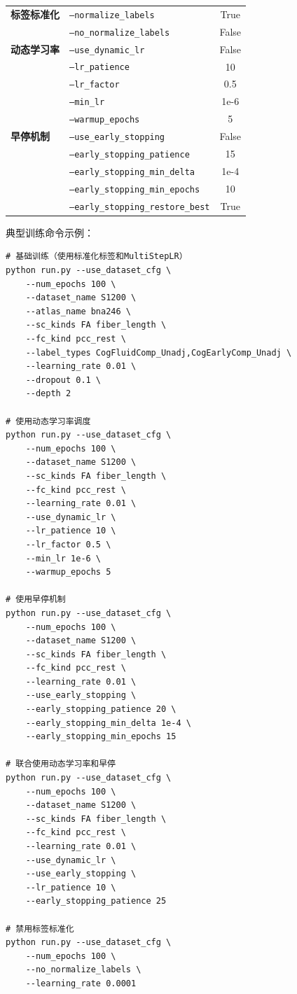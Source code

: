 \begin{table}[htbp]
\begin{tabular}{llc}
\textbf{标签标准化} & \texttt{--normalize\_labels} & True \\
 & \texttt{--no\_normalize\_labels} & False \\
\midrule
\textbf{动态学习率} & \texttt{--use\_dynamic\_lr} & False \\
 & \texttt{--lr\_patience} & 10 \\
 & \texttt{--lr\_factor} & 0.5 \\
 & \texttt{--min\_lr} & 1e-6 \\
 & \texttt{--warmup\_epochs} & 5 \\
\midrule
\textbf{早停机制} & \texttt{--use\_early\_stopping} & False \\
 & \texttt{--early\_stopping\_patience} & 15 \\
 & \texttt{--early\_stopping\_min\_delta} & 1e-4 \\
 & \texttt{--early\_stopping\_min\_epochs} & 10 \\
 & \texttt{--early\_stopping\_restore\_best} & True \\
\bottomrule
\end{tabular}
\end{table}

典型训练命令示例：

\begin{verbatim}
# 基础训练（使用标准化标签和MultiStepLR）
python run.py --use_dataset_cfg \
    --num_epochs 100 \
    --dataset_name S1200 \
    --atlas_name bna246 \
    --sc_kinds FA fiber_length \
    --fc_kind pcc_rest \
    --label_types CogFluidComp_Unadj,CogEarlyComp_Unadj \
    --learning_rate 0.01 \
    --dropout 0.1 \
    --depth 2

# 使用动态学习率调度
python run.py --use_dataset_cfg \
    --num_epochs 100 \
    --dataset_name S1200 \
    --sc_kinds FA fiber_length \
    --fc_kind pcc_rest \
    --learning_rate 0.01 \
    --use_dynamic_lr \
    --lr_patience 10 \
    --lr_factor 0.5 \
    --min_lr 1e-6 \
    --warmup_epochs 5

# 使用早停机制
python run.py --use_dataset_cfg \
    --num_epochs 100 \
    --dataset_name S1200 \
    --sc_kinds FA fiber_length \
    --fc_kind pcc_rest \
    --learning_rate 0.01 \
    --use_early_stopping \
    --early_stopping_patience 20 \
    --early_stopping_min_delta 1e-4 \
    --early_stopping_min_epochs 15

# 联合使用动态学习率和早停
python run.py --use_dataset_cfg \
    --num_epochs 100 \
    --dataset_name S1200 \
    --sc_kinds FA fiber_length \
    --fc_kind pcc_rest \
    --learning_rate 0.01 \
    --use_dynamic_lr \
    --use_early_stopping \
    --lr_patience 10 \
    --early_stopping_patience 25

# 禁用标签标准化
python run.py --use_dataset_cfg \
    --num_epochs 100 \
    --no_normalize_labels \
    --learning_rate 0.0001
\end{verbatim}

